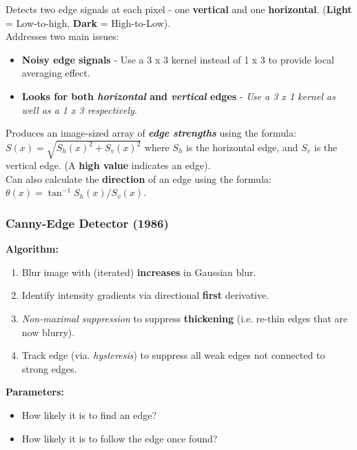 \documentclass[english, 10pt]{article}
\begin{document}
  Detects two edge signals at each pixel - one \textbf{vertical} and one
  \textbf{horizontal}. (\textbf{Light} = Low-to-high, \textbf{Dark} = High-to-Low).\\
  
  Addresses two main issues:

  \begin{itemize}
	
  \def\labelenumi{\arabic{enumi}.}
  \itemsep1pt\parskip0pt
  \item
    \textbf{Noisy edge signals} - Use a 3 x 3 kernel instead of 1 x 3 to provide local averaging effect.
  \item
    \textbf{Looks for both \emph{horizontal} and \emph{vertical} edges} -
    \emph{Use a 3 x 1 kernel as well as a 1 x 3 respectively}.
   \end{itemize}

  Produces an image-sized array of \textbf{\emph{edge strengths}} using
  the formula: $S(x) = \sqrt{S_h(x)^2 + S_v(x)^2}$ where $S_h$ is the horizontal edge, and $S_v$ is the vertical edge. (A \textbf{high value} indicates an edge). \\
  
  Can also calculate the \textbf{direction} of an edge using the
  formula: $\theta(x) = \tan^{-1}S_h(x) / S_v(x)$.

\subsubsection{Canny-Edge Detector
(1986)}\label{canny-edge-detector-1986}

\textbf{Algorithm:}

  \begin{enumerate}
  \item Blur image with (iterated) \textbf{increases} in Gaussian blur.
  \item Identify intensity gradients via directional \textbf{first} derivative.
  \item \emph{Non-maximal suppression} to suppress \textbf{thickening} (i.e. re-thin edges that are now blurry). 
  \item Track edge (via. \textit{hysteresis}) to suppress all weak edges not connected to strong edges.
  \end{enumerate}
  
\textbf{Parameters:}
 \begin{itemize}
 \item How likely it is to find an edge?
 \item How likely it is to follow the edge once found?
 \end{itemize}
\end{document}

